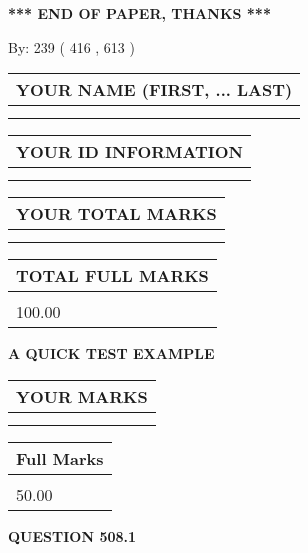 \documentclass[12pt]{article}
\begin{document}
\vspace{1.0in} 
{\textbf{\large{ *** END OF PAPER, THANKS *** }}} 
   
   
\hspace{1.0in} By: 
 239 ( 416 ,  613 )
   
   
   
   
\newpage 
\setcounter{page}{ 
   508001 } 
   
   
   
   
\noindent\begin{tabular}{|l|}
\hline
YOUR NAME (FIRST, ... LAST)  \\
\hline
 \\ 
 \\ 
\hline
\end{tabular}
\hspace{0.05in} \begin{tabular}{|l|}
\hline
 YOUR   ID   INFORMATION  \\
\hline
 \\ 
 \\ 
\hline
\end{tabular}
   
   
\vspace{0.2in}\noindent\begin{tabular}{|l|}
\hline
YOUR TOTAL MARKS  \\
\hline
 \\ 
 \\ 
\hline
\end{tabular}
\hspace{0.05in} \begin{tabular}{|l|}
\hline
TOTAL FULL MARKS  \\
\hline
 \\ 
100.00 \\
\hline
\end{tabular}
   
   
 \vspace{0.2in}
{\LARGE {\textbf{ A QUICK TEST EXAMPLE}}}
   
   
  
\vspace{0.2in}
  
\noindent\begin{tabular}{|l|}
\hline
 YOUR MARKS  \\
\hline
 \\ 
 \\ 
\hline
\end{tabular}
\hspace{0.05in} \begin{tabular}{|l|}
\hline
 Full Marks  \\
\hline
 \\ 
50.00 \\
\hline
\end{tabular}
{\textbf{\Large{QUESTION
508.1 
}}}
  
\end{document}
